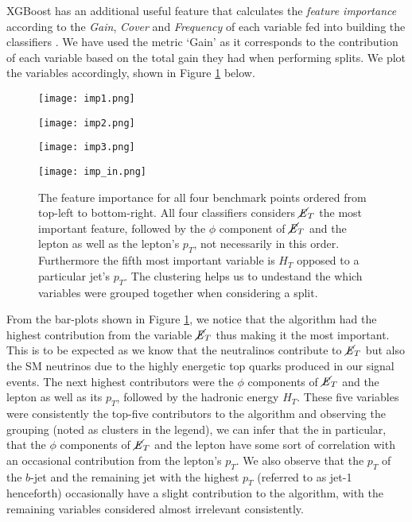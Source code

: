 XGBoost has an additional useful feature that calculates the \textit{feature importance} according to the \textit{Gain}, \textit{Cover} and \textit{Frequency} of each variable fed into building the classifiers \cite{xgboost}. We have used the metric `Gain' as it corresponds to the contribution of each variable based on the total gain they had when performing splits. We plot the variables accordingly, shown in Figure \ref{fig:imps} below. \\

\begin{figure}[htbp]
\centering
  \begin{minipage}[htbp]{0.49\textwidth}
    \centering
    \texttt{[image: imp1.png]}
  \end{minipage}
  \hfill
  \begin{minipage}[htbp]{0.49\textwidth}
    \centering
    \texttt{[image: imp2.png]}
  \end{minipage}
  \hfill
  \begin{minipage}[htbp]{0.49\textwidth}
    \centering
    \texttt{[image: imp3.png]}
  \end{minipage}
  \hfill
  \begin{minipage}[htbp]{0.49\textwidth}
    \centering
    \texttt{[image: imp\_in.png]}
  \end{minipage}
  \caption{The feature importance for all four benchmark points ordered from top-left to bottom-right. All four classifiers considers $\cancel{\it{E}}_{T}$ the most important feature, followed by the $\phi$ component of $\cancel{\it{E}}_{T}$ and the lepton as well as the lepton's $p_T$, not necessarily in this order. Furthermore the fifth most important variable is $H_T$ opposed to a particular jet's $p_T$. The clustering helps us to undestand the which variables were grouped together when considering a split.}
  \label{fig:imps}
\end{figure}

From the bar-plots shown in Figure \ref{fig:imps}, we notice that the algorithm had the highest contribution from the variable $\cancel{\it{E}}_{T}$ thus making it the most important. This is to be expected as we know that the neutralinos contribute to $\cancel{\it{E}}_{T}$ but also the SM neutrinos due to the highly energetic top quarks produced in our signal events. The next highest contributors were the $\phi$ components of $\cancel{\it{E}}_{T}$ and the lepton as well as its $p_T$, followed by the hadronic energy $H_T$. These five variables were consistently the top-five contributors to the algorithm and observing the grouping (noted as clusters in the legend), we can infer that the in particular, that the $\phi$ components of $\cancel{\it{E}}_{T}$ and the lepton have some sort of correlation with an occasional contribution from the lepton's $p_T$. We also observe that the $p_T$ of the $b$-jet and the remaining jet with the highest $p_T$ (referred to as jet-1 henceforth) occasionally have a slight contribution to the algorithm, with the remaining variables considered almost irrelevant consistently.
